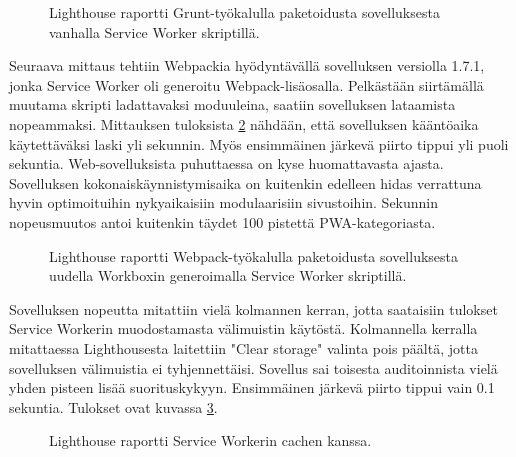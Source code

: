 \documentclass{tktltiki}
\begin{document}
\begin{figure}[h]
\begin{center}
\caption{Lighthouse raportti Grunt-työkalulla paketoidusta sovelluksesta vanhalla Service Worker skriptillä.}
\label{Lighthouse raportti 1}
\end{center}
\end{figure}

\clearpage

Seuraava mittaus tehtiin Webpackia hyödyntävällä sovelluksen versiolla 1.7.1, jonka Service Worker oli generoitu Webpack-lisäosalla. Pelkästään siirtämällä muutama skripti ladattavaksi moduuleina, saatiin sovelluksen lataamista nopeammaksi. Mittauksen tuloksista \ref{Lighthouse raportti 2} nähdään, että sovelluksen kääntöaika käytettäväksi laski yli sekunnin. Myös ensimmäinen järkevä piirto tippui yli puoli sekuntia. Web-sovelluksista puhuttaessa on kyse huomattavasta ajasta. Sovelluksen kokonaiskäynnistymisaika on kuitenkin edelleen hidas verrattuna hyvin optimoituihin nykyaikaisiin modulaarisiin sivustoihin. Sekunnin nopeusmuutos antoi kuitenkin täydet 100 pistettä PWA-kategoriasta. 

\begin{figure}[h]
\begin{center}
\caption{Lighthouse raportti Webpack-työkalulla paketoidusta sovelluksesta uudella Workboxin generoimalla Service Worker skriptillä.}
\label{Lighthouse raportti 2}
\end{center}
\end{figure}

\clearpage

Sovelluksen nopeutta mitattiin vielä kolmannen kerran, jotta saataisiin tulokset Service Workerin muodostamasta välimuistin käytöstä. Kolmannella kerralla mitattaessa Lighthousesta laitettiin "Clear storage" valinta pois päältä, jotta sovelluksen välimuistia ei tyhjennettäisi. Sovellus sai toisesta auditoinnista vielä yhden pisteen lisää suorituskykyyn. Ensimmäinen järkevä piirto tippui vain 0.1 sekuntia. Tulokset ovat kuvassa \ref{Lighthouse raportti 3}.

\begin{figure}[h]
\begin{center}
\caption{Lighthouse raportti Service Workerin cachen kanssa.}
\label{Lighthouse raportti 3}
\end{center}
\end{figure}
\end{document}
